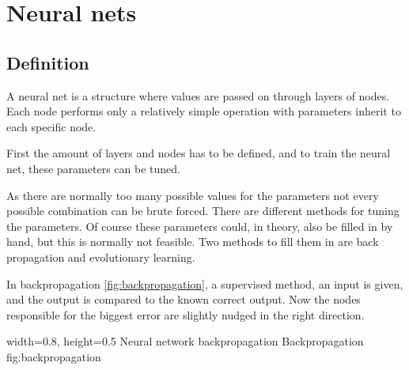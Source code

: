 \section{Neural nets} 
\label{sec:NN}
\subsection{Definition} \cite[p727]{MA}
A neural net is a structure where values are passed on through layers of nodes. Each node performs only a relatively simple operation with parameters inherit to each specific node.

First the amount of layers and nodes has to be defined, and to train the neural net, these parameters can be tuned.

As there are normally too many possible values for the parameters not every possible combination can be brute forced. There are different methods for tuning the parameters. Of course these parameters could, in theory, also be filled in by hand, but this is normally not feasible. Two methods to fill them in are back propagation and evolutionary learning.

In backpropagation \ref{fig:backpropagation}, a supervised method, an input is given, and the output is compared to the known correct output. Now the nodes responsible for the biggest error are slightly nudged in the right direction. 

    {width=0.8\textwidth, height=0.5\textheight} %
    {Neural network backpropagation}   %
    {Backpropagation}   %
    {fig:backpropagation}    %


